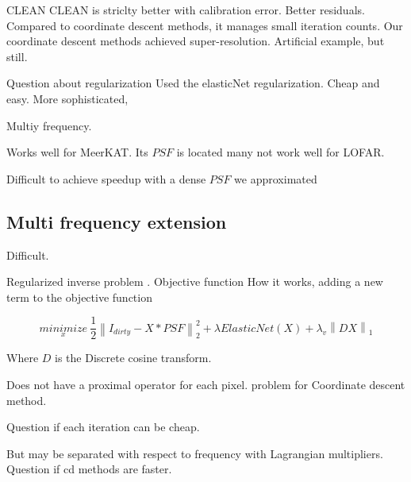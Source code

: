 CLEAN
CLEAN is striclty better with calibration error.
Better residuals. Compared to coordinate descent methods, it manages small iteration counts.
Our coordinate descent methods achieved super-resolution. Artificial example, but still.

Question about regularization
Used the elasticNet regularization. Cheap and easy. More sophisticated, 

Multiy frequency.



Works well for MeerKAT. Its $PSF$ is located many not work well for LOFAR.

Difficult to achieve speedup with a dense $PSF$ we approximated












\subsection{Multi frequency extension}\label{discussion:mfs}
Difficult.

Regularized inverse problem  \cite{ferrari2015multi}. Objective function 
How it works, adding a new term to the objective function

\begin{equation}\label{cd:deconv}
\underset{x}{minimize} \: \frac{1}{2} \left \| I_{dirty} - X * PSF \right \|_2^2 + \lambda ElasticNet(X) + \lambda_v \left \| DX \right \|_1
\end{equation}

Where $D$ is the Discrete cosine transform.

Does not have a proximal operator for each pixel. problem for Coordinate descent method.

Question if each iteration can be cheap.

But may be separated with respect to frequency with Lagrangian multipliers. Question if cd methods are faster.
